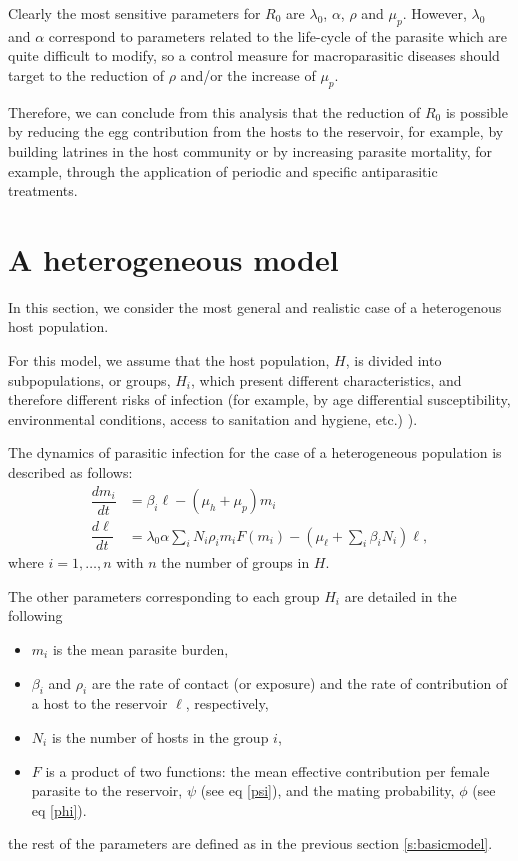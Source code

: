 \documentclass[eng]{MMSB-class-eng}
\begin{document}
{{	Clearly the most sensitive parameters for $R_0$ are $\lambda_0$, $\alpha$, $\rho$ and $\mu_p$.
	However, $\lambda_0$ and $\alpha$ correspond to parameters related to the life-cycle of the parasite which are quite difficult to modify, so a control measure for macroparasitic diseases should target to the reduction of $\rho$ and/or the increase of $\mu_p$.
	
	Therefore, we can conclude from this analysis that the reduction of $R_0$ 
	is possible by reducing the egg contribution from the hosts to the reservoir, for example, by building latrines in the host community or by increasing parasite mortality, for example, through the application of periodic and specific antiparasitic treatments.	
	
}


\section{A heterogeneous model}
{\color{red}
In this section, we consider the most general and realistic case of a heterogenous host population. 

For this model, we assume that the host population, $H$, is divided into subpopulations, or groups, $H_i$, which present different characteristics, and therefore different risks of infection (for example, by age differential susceptibility, environmental conditions, access to sanitation and hygiene, etc.) 
\cite{anderson1992infectious,anderson2014coverage,brooker2006contrasting,freeman2015associations,truscott2014modeling}).

The dynamics of parasitic infection for the case of a heterogeneous population is described as follows:
\begin{equation}\label{model2}
\begin{split}
\dfrac{dm_i}{dt}&=\beta_i \ell - (\mu_h+\mu_p) m_i\\
\dfrac{d\ell}{dt}&= 
\lambda_0 \alpha
\sum_i  N_i \rho_i  m_i F(m_i)   - (\mu_{\ell}+\sum_i \beta_i N_i ) \ell ,
\end{split}
\end{equation} 
where $i=1,\ldots,n$ with $n$ the number of groups in $H$.     

The other parameters corresponding to each group $H_i$ are detailed in the following

\begin{itemize}
	\item $m_i$ is the mean parasite burden,
	\item $\beta_i$ and $\rho_i$  are the rate of contact (or exposure) and the rate of contribution
	of a host to the reservoir $\ell$, respectively,
	\item $N_{i}$ is the number of hosts in the group $i$,
	\item $F$ is a product of two functions: the mean effective contribution per female parasite to the reservoir, $\psi$ (see eq \eqref{psi}), and the mating probability, $\phi$ (see eq \eqref{phi}).  
\end{itemize}
the rest of the parameters are defined as in the previous section \ref{s:basicmodel}.
}

}
\end{document}
